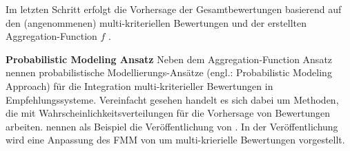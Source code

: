 Im letzten Schritt erfolgt die Vorhersage der Gesamtbewertungen basierend auf den (angenommenen) multi-kriteriellen Bewertungen und der erstellten Aggregation-Function $f$ \cite[S. 861]{adomavicius:4:inbook}.

\textbf{Probabilistic Modeling Ansatz}
Neben dem Aggregation-Function Ansatz nennen \textcite[S. 861]{adomavicius:4:inbook} probabilistische Modellierungs-Ansätze (engl.: Probabilistic Modeling Approach) für die Integration multi-kriterieller Bewertungen in Empfehlungssysteme.
Vereinfacht gesehen handelt es sich dabei um Methoden, die mit Wahrscheinlichkeitsverteilungen für die Vorhersage von Bewertungen arbeiten.
\textcite[S. 861]{adomavicius:4:inbook} nennen als Beispiel die Veröffentlichung von \textcite[S. 231]{sahoo:article}.
In der Veröffentlichung wird eine Anpassung des \ac{FMM} von \textcite[S. 704ff.]{si:inproceedings} um multi-krierielle Bewertungen vorgestellt.


